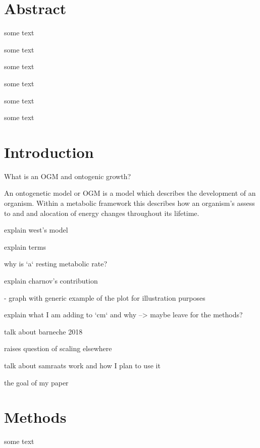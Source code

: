 \documentclass[a4paper]{article}
\begin{document}
	

	\section*{Abstract}
	\linenumbers
	some text
	
	some text
	
	some text
	
	some text
	
	some text
	
	some text
	
	
	
	\nolinenumbers
	
	
	\tableofcontents
	\newpage


\section{Introduction}
	\linenumbers
	What is an OGM and ontogenic growth?
	
	An ontogenetic model or OGM is a model which describes the development of an organism.  Within a metabolic framework this describes how an organism's assess to and and alocation of energy changes throughout its lifetime.
	
	explain west's model
	
	explain terms 
	
	why is `a` resting metabolic rate?
	
	explain charnov's contribution
	
	- graph with generic example of the plot for illustration purposes
	
	explain what I am adding to `cm` and why --> maybe leave for the methods?
	
	talk about barneche 2018
	
	raises question of scaling elsewhere 
	
	talk about samraats work and how I plan to use it
	
	the goal of my paper
	
	\nolinenumbers
\section{Methods}
	\linenumbers
	some text
	\nolinenumbers
\end{document}
